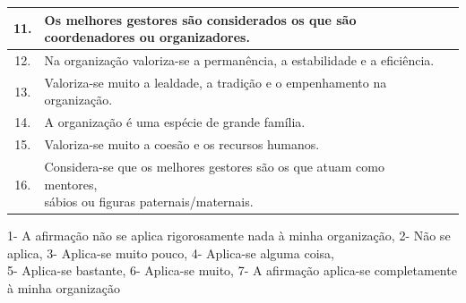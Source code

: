 \begin{table}[H]
\begin{adjustbox}{max width=\textwidth}
\begin{tabular}{ |c|l|c| }
\hline
11. & Os melhores gestores são considerados os que são coordenadores ou organizadores. & \\
\hline
12. & Na organização valoriza-se a permanência, a estabilidade e a eficiência. & \\
\hline
13. & Valoriza-se muito a lealdade, a tradição e o empenhamento na organização. & \\
\hline
14. & A organização é uma espécie de grande família. & \\
\hline
15. & Valoriza-se muito a coesão e os recursos humanos. & \\
\hline
16. & \makecell[l]{Considera-se que os melhores gestores são os que atuam como mentores, \\ sábios ou figuras paternais/maternais.} & \\
\hline
\end{tabular}
\end{adjustbox}
\end{table}
{\tiny 1- A afirmação não se aplica rigorosamente nada à minha organização, 2- Não se aplica, 3- Aplica-se muito pouco, 4- Aplica-se alguma coisa,\\ 5- Aplica-se bastante, 6- Aplica-se muito, 7- A afirmação aplica-se completamente à minha organização
}
